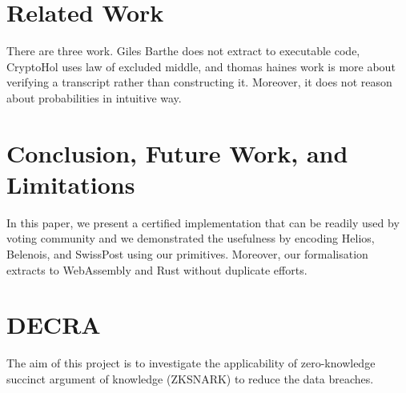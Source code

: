 \documentclass[sigconf]{acmart}
\begin{document}
\section{Related Work}
  There are three work. Giles Barthe does not extract to executable code, 
  CryptoHol uses law of excluded middle, and thomas haines work is more about 
  verifying a transcript rather than constructing it. Moreover, 
  it does not reason about probabilities in intuitive way. 

\section{Conclusion, Future Work, and Limitations}
  In this paper, we present a certified implementation 
  that can be readily used by voting community and 
  we demonstrated the usefulness by encoding Helios, 
  Belenois, and SwissPost using our primitives. 
  Moreover, our formalisation extracts to WebAssembly and 
  Rust without duplicate efforts. 


\section{DECRA}
The aim of this project is to investigate the applicability of 
zero-knowledge succinct argument of knowledge (ZKSNARK) 
to reduce the data breaches. 








\end{document}
